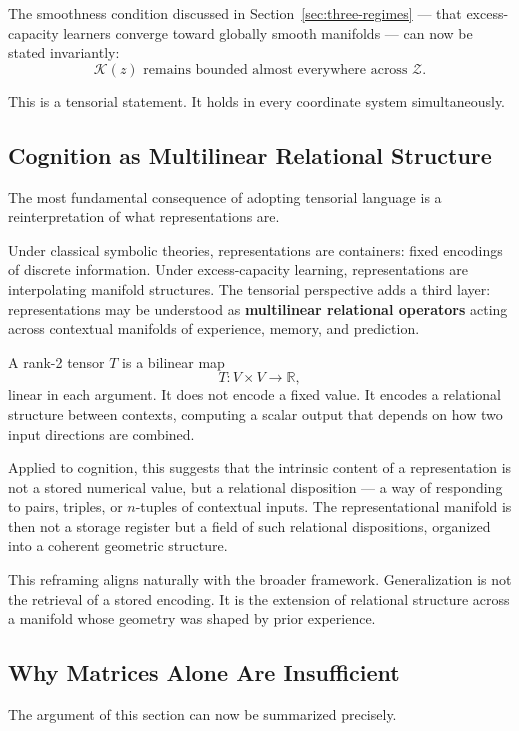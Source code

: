\documentclass[12pt,a4paper]{article}
\begin{document}
The smoothness condition discussed in Section~\ref{sec:three-regimes} --- that excess-capacity learners converge toward globally smooth manifolds --- can now be stated invariantly:
\[
\mathcal{K}(z) \text{ remains bounded almost everywhere across } \mathcal{Z}.
\]

This is a tensorial statement. It holds in every coordinate system simultaneously.

\subsection{Cognition as Multilinear Relational Structure}

The most fundamental consequence of adopting tensorial language is a reinterpretation of what representations are.

Under classical symbolic theories, representations are containers: fixed encodings of discrete information. Under excess-capacity learning, representations are interpolating manifold structures. The tensorial perspective adds a third layer: representations may be understood as \textbf{multilinear relational operators} acting across contextual manifolds of experience, memory, and prediction.

A rank-2 tensor $T$ is a bilinear map
\[
T : V \times V \to \mathbb{R},
\]
linear in each argument. It does not encode a fixed value. It encodes a relational structure between contexts, computing a scalar output that depends on how two input directions are combined.

Applied to cognition, this suggests that the intrinsic content of a representation is not a stored numerical value, but a relational disposition --- a way of responding to pairs, triples, or $n$-tuples of contextual inputs. The representational manifold is then not a storage register but a field of such relational dispositions, organized into a coherent geometric structure.

This reframing aligns naturally with the broader framework. Generalization is not the retrieval of a stored encoding. It is the extension of relational structure across a manifold whose geometry was shaped by prior experience.

\subsection{Why Matrices Alone Are Insufficient}

The argument of this section can now be summarized precisely.
\end{document}
